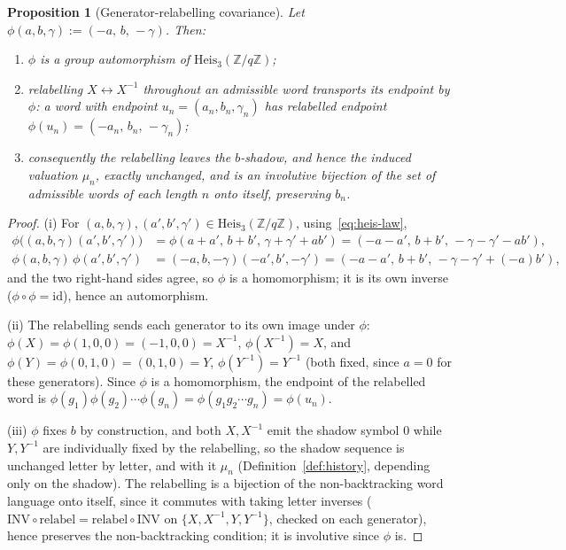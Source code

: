 \documentclass[11pt,a4paper]{article}
\newtheorem{proposition}[theorem]{Proposition}
\theoremstyle{definition}
\theoremstyle{remark}
\newcommand{\Z}{\mathbb{Z}}
\newcommand{\Heis}{\mathrm{Heis}_3(\Z/q\Z)}
\begin{document}
\begin{proposition}[Generator-relabelling covariance]
  \label{prop:relabel}
  Let $\phi(a,b,\gamma) := (-a,\,b,\,-\gamma)$. Then:
  \begin{enumerate}[label=(\roman*)]
    \item $\phi$ is a group automorphism of $\Heis$;
    \item relabelling $X\leftrightarrow X^{-1}$ throughout an admissible word transports
    its endpoint by $\phi$: a word with endpoint $u_n=(a_n,b_n,\gamma_n)$ has relabelled
    endpoint $\phi(u_n) = (-a_n,\,b_n,\,-\gamma_n)$;
    \item consequently the relabelling leaves the $b$-shadow, and hence the induced
    valuation $\mu_n$, exactly unchanged, and is an involutive bijection of the set of
    admissible words of each length $n$ onto itself, preserving $b_n$.
  \end{enumerate}
\end{proposition}

\begin{proof}
  (i) For $(a,b,\gamma),(a',b',\gamma')\in\Heis$, using~\eqref{eq:heis-law},
  \begin{align*}
    \phi\bigl((a,b,\gamma)(a',b',\gamma')\bigr)
    &= \phi(a+a',\,b+b',\,\gamma+\gamma'+ab')
    = (-a-a',\,b+b',\,-\gamma-\gamma'-ab'), \\
    \phi(a,b,\gamma)\,\phi(a',b',\gamma')
    &= (-a,b,-\gamma)(-a',b',-\gamma')
    = (-a-a',\,b+b',\,-\gamma-\gamma'+(-a)b'),
  \end{align*}
  and the two right-hand sides agree, so $\phi$ is a homomorphism; it is its own
  inverse ($\phi\circ\phi=\mathrm{id}$), hence an automorphism.

  (ii) The relabelling sends each generator to its own image under $\phi$:
  $\phi(X)=\phi(1,0,0)=(-1,0,0)=X^{-1}$, $\phi(X^{-1})=X$, and $\phi(Y)=\phi(0,1,0)
  =(0,1,0)=Y$, $\phi(Y^{-1})=Y^{-1}$ (both fixed, since $a=0$ for these generators).
  Since $\phi$ is a homomorphism, the endpoint of the relabelled word is
  $\phi(g_1)\phi(g_2)\cdots\phi(g_n) = \phi(g_1g_2\cdots g_n) = \phi(u_n)$.

  (iii) $\phi$ fixes $b$ by construction, and both $X,X^{-1}$ emit the shadow symbol
  $0$ while $Y,Y^{-1}$ are individually fixed by the relabelling, so the shadow
  sequence is unchanged letter by letter, and with it $\mu_n$
  (Definition~\ref{def:history}, depending only on the shadow). The relabelling is a
  bijection of the non-backtracking word language onto itself, since it commutes with
  taking letter inverses ($\mathrm{INV}\circ\mathrm{relabel} = \mathrm{relabel}\circ
  \mathrm{INV}$ on $\{X,X^{-1},Y,Y^{-1}\}$, checked on each generator), hence preserves
  the non-backtracking condition; it is involutive since $\phi$ is.
\end{proof}
\end{document}
